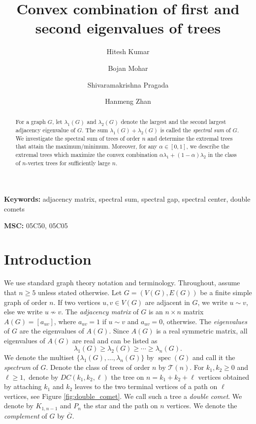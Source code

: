 \documentclass[11pt]{article}
\title{Convex combination of first and second eigenvalues of trees}
\author{Hitesh Kumar \and Bojan Mohar \and Shivaramakrishna Pragada \and Hanmeng Zhan}
\date{}
\theoremstyle{plain}
\numberwithin{equation}{section}
\DeclareMathOperator{\spec}{spec}
\begin{document}
\maketitle
\begin{abstract}
For a graph $G$, let $\lambda_1(G)$ and $\lambda_2(G)$ denote the largest and the second largest adjacency eigenvalue of $G$. The sum $\lambda_1(G) + \lambda_2(G)$ is called the \emph{spectral sum} of $G$. We investigate the spectral sum of trees of order $n$ and determine the extremal trees that attain the maximum/minimum. Moreover, for any $\alpha \in [0,1]$, we describe the extremal trees which maximize the convex combination $\alpha \lambda_1 + (1-\alpha)\lambda_2$ in the class of $n$-vertex trees for sufficiently large $n$.
\end{abstract}

\noindent
\textbf{Keywords:} adjacency matrix, spectral sum, spectral gap, spectral center, double comets

\noindent
\textbf{MSC:} 05C50, 05C05

\section{Introduction}

We use standard graph theory notation and terminology. Throughout, assume that $n\ge 5$ unless stated otherwise. Let $G = (V(G), E(G))$ be a finite simple graph of order $n$. If two vertices $u, v\in V(G)$ are adjacent in $G$, we write $u\sim v$, else we write $u\nsim v$. The \textit{adjacency matrix} of $G$ is an $n\times n$ matrix $A(G) = [a_{uv}]$, where $a_{uv} = 1$ if $u\sim v$ and $a_{uv} = 0$, otherwise. The \emph{eigenvalues} of $G$ are the eigenvalues of $A(G)$. Since $A(G)$ is a real symmetric matrix, all eigenvalues of $A(G)$ are real and can be listed as  
\[\lambda_1(G) \geq \lambda_2(G) \geq \cdots \geq \lambda_n(G).\]
We denote the multiset $\{\lambda_1(G), \ldots, \lambda_n(G)\}$ by $\spec(G)$ and call it the \emph{spectrum} of $G$. Denote the class of trees of order $n$ by $\mathcal{T}(n)$. For $k_1,  k_2\geq 0$ and 
$\ell\geq 1,$ denote by $DC(k_1,k_2,\ell)$ the tree on $n=k_1+k_2+\ell$ vertices obtained by attaching $k_1$ and $k_2$ leaves to the two terminal vertices of a path on $\ell$ vertices, see Figure \ref{fig:double_comet}. We call such a tree a \emph{double comet}. We denote by $K_{1,n-1}$ and $P_n$ the star and the path on $n$ vertices. We denote the \emph{complement} of $G$ by $\overline{G}$.
\end{document}
